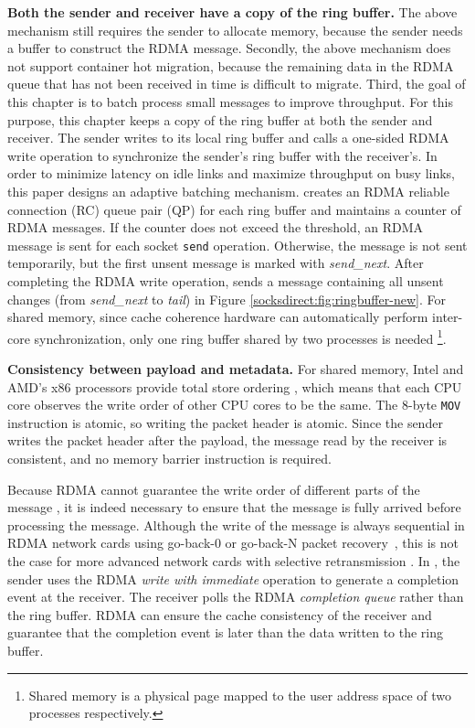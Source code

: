 \textbf {Both the sender and receiver have a copy of the ring buffer.}
The above mechanism still requires the sender to allocate memory, because the sender needs a buffer to construct the RDMA message.
Secondly, the above mechanism does not support container hot migration, because the remaining data in the RDMA queue that has not been received in time is difficult to migrate.
Third, the goal of this chapter is to batch process small messages to improve throughput.
For this purpose, this chapter keeps a copy of the ring buffer at both the sender and receiver.
The sender writes to its local ring buffer and calls a one-sided RDMA write operation to synchronize the sender's ring buffer with the receiver's.
In order to minimize latency on idle links and maximize throughput on busy links, this paper designs an adaptive batching mechanism.
\libipc{} creates an RDMA reliable connection (RC) queue pair (QP) for each ring buffer and maintains a counter of RDMA messages.
If the counter does not exceed the threshold, an RDMA message is sent for each socket \texttt {send} operation.
Otherwise, the message is not sent temporarily, but the first unsent message is marked with \emph {send\_next}.
After completing the RDMA write operation, \libipc{} sends a message containing all unsent changes (from \emph {send\_next} to \emph {tail}) in Figure \ref {socksdirect:fig:ringbuffer-new}.
For shared memory, since cache coherence hardware can automatically perform inter-core synchronization, only one ring buffer shared by two processes is needed \footnote{Shared memory is a physical page mapped to the user address space of two processes respectively.}.

\textbf{Consistency between payload and metadata.}
For shared memory, Intel and AMD's x86 processors provide total store ordering \cite{sewell2010x86,intel-manual}, which means that each CPU core observes the write order of other CPU cores to be the same. The 8-byte \texttt{MOV} instruction is atomic, so writing the packet header is atomic. Since the sender writes the packet header after the payload, the message read by the receiver is consistent, and no memory barrier instruction is required.

Because RDMA cannot guarantee the write order of different parts of the message \cite{infiniband2000infiniband}, it is indeed necessary to ensure that the message is fully arrived before processing the message. Although the write of the message is always sequential in RDMA network cards using go-back-0 or go-back-N packet recovery~\cite{dragojevic2014farm}, this is not the case for more advanced network cards with selective retransmission \cite{mprdma,mittal2018retransmission}. In \libipc{}, the sender uses the RDMA \textit{write with immediate} operation to generate a completion event at the receiver. The receiver polls the RDMA \emph{completion queue} rather than the ring buffer. RDMA can ensure the cache consistency of the receiver and guarantee that the completion event is later than the data written to the \libipc{} ring buffer.

